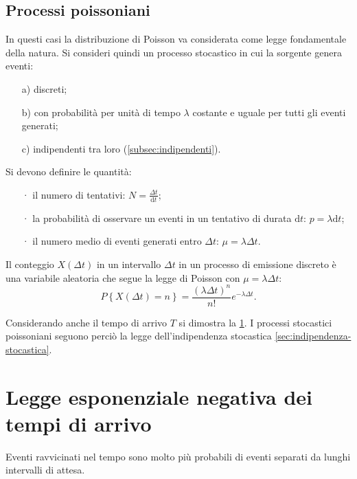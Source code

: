 \subsection{Processi poissoniani} %
\label{subsec:processi-poisson}
In questi casi la distribuzione di Poisson va considerata come legge fondamentale della natura. Si consideri quindi un processo stocastico in cui la sorgente genera eventi:
\begin{itemize}
\item[a)] discreti;
\item[b)] con probabilità per unità di tempo $\lambda$ costante e uguale per tutti gli eventi generati;
\item[c)] indipendenti tra loro (\ref{subsec:indipendenti}).
\end{itemize}
Si devono definire le quantità:
\begin{itemize}
\item[·] il numero di tentativi: $N=\frac { \Delta t }{ \textrm{d}t } $;
\item[·] la probabilità di osservare un eventi in un tentativo di durata $\textrm{d}t$: $p=\lambda \textrm{d}t$;
\item[·] il numero medio di eventi generati entro $\Delta t$: $\mu = \lambda \Delta t$.
\end{itemize}
Il conteggio $X(\Delta t)$ in un intervallo $\Delta t$ in un processo di emissione discreto è una variabile aleatoria che segue la legge di Poisson con $\mu = \lambda \Delta t$:
\begin{equation}
P\left\{ X\left( \Delta t \right) =n \right\} =\frac { { \left( \lambda \Delta t \right)  }^{ n } }{ n! } { e }^{ -\lambda \Delta t }.
\end{equation}

Considerando anche il tempo di arrivo $T$ si dimostra la \ref{sec:esponenziale-negativa}. I processi stocastici poissoniani seguono perciò la legge dell'indipendenza stocastica \ref{sec:indipendenza-stocastica}.

\section{Legge esponenziale negativa dei tempi di arrivo} %
\label{sec:esponenziale-negativa}
Eventi ravvicinati nel tempo sono molto più probabili di eventi separati da lunghi intervalli di attesa. 

